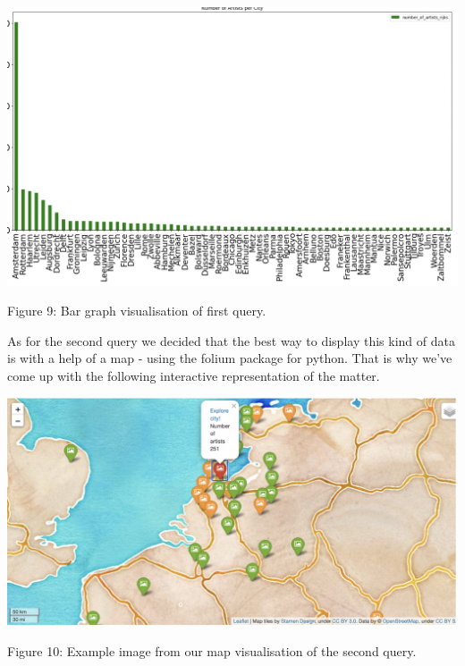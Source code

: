 \documentclass{article}
\begin{document}
\begin{center}
\includegraphics[scale=0.4]{bonus.png}
\newline
\caption{Figure 9: Bar graph visualisation of first query.}
\end{center}

As for the second query we decided that the best way to display this kind of data is with a help of a map - using the folium package for python. That is why we've come up with the following interactive representation of the matter. 

\begin{center}
\includegraphics[scale=0.4]{map.png}
\newline
\caption{Figure 10: Example image from our map visualisation of the second query.}
\end{center}


\end{document}
